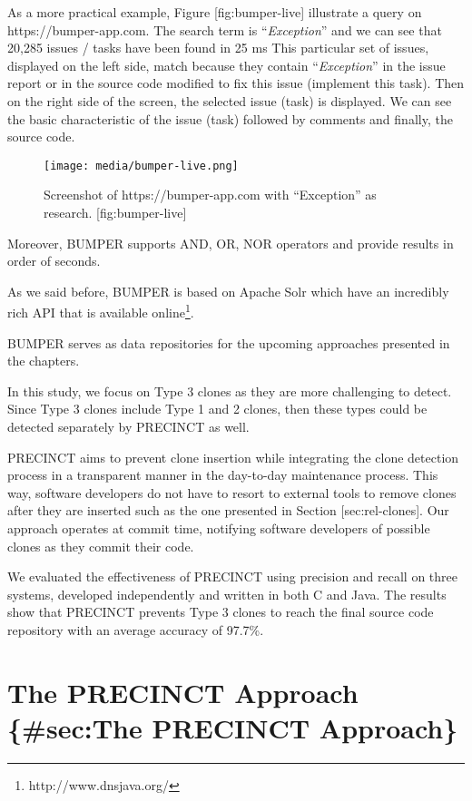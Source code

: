 As a more practical example, Figure {[}fig:bumper-live{]} illustrate a
query on https://bumper-app.com. The search term is
``{\emph{Exception}}'' and we can see that 20,285 issues / tasks have
been found in 25 ms This particular set of issues, displayed on the left
side, match because they contain ``{\emph{Exception}}'' in the issue
report or in the source code modified to fix this issue (implement this
task). Then on the right side of the screen, the selected issue (task)
is displayed. We can see the basic characteristic of the issue (task)
followed by comments and finally, the source code.

\begin{figure}[htbp]
\centering
\texttt{[image: media/bumper-live.png]}
\caption{Screenshot of https://bumper-app.com with ``Exception'' as
research. {[}fig:bumper-live{]}}
\end{figure}

Moreover, BUMPER supports AND, OR, NOR operators and provide results in
order of seconds.

As we said before, BUMPER is based on Apache Solr which have an
incredibly rich API that is available online\footnote{http://www.dnsjava.org/}.

{BUMPER} serves as data repositories for the upcoming approaches
presented in the chapters.

In this study, we focus on Type 3 clones as they are more challenging to
detect. Since Type 3 clones include Type 1 and 2 clones, then these
types could be detected separately by PRECINCT as well.

PRECINCT aims to prevent clone insertion while integrating the clone
detection process in a transparent manner in the day-to-day maintenance
process. This way, software developers do not have to resort to external
tools to remove clones after they are inserted such as the one presented
in Section {[}sec:rel-clones{]}. Our approach operates at commit time,
notifying software developers of possible clones as they commit their
code.

We evaluated the effectiveness of PRECINCT using precision and recall on
three systems, developed independently and written in both C and Java.
The results show that PRECINCT prevents Type 3 clones to reach the final
source code repository with an average accuracy of 97.7\%.

\section{The PRECINCT Approach \{\#sec:The PRECINCT
Approach\}}\label{the-precinct-approach-secthe-precinct-approach}


